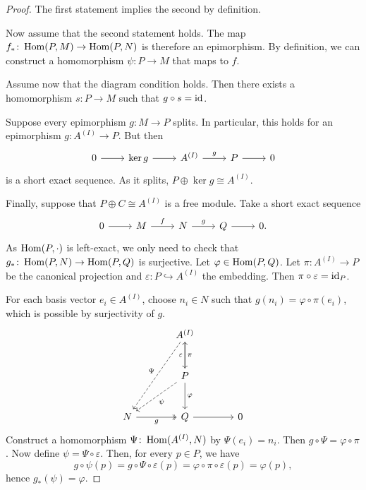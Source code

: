 \begin{proof}
The first statement implies the second by definition.

Now assume that the second statement holds. The map
$f_* \colon \operatorname{Hom}(P, M) \to \operatorname{Hom}(P, N)$ is therefore an epimorphism.
By definition, we can construct a homomorphism
$\psi \colon P \to M$ that maps to $f$.

Assume now that the diagram condition holds. Then there exists
a homomorphism $s \colon P \to M$ such that $g \circ s = \operatorname{id}$.

Suppose every epimorphism $g \colon M \to P$ splits. In particular,
this holds for an epimorphism $g \colon A^{(I)} \to P$. But then
\[
\begin{tikzcd}
0 \arrow[r] &
\ker g \arrow[r] &
A^{(I)} \arrow[r, "g"] &
P \arrow[r] &
0
\end{tikzcd}
\]
is a short exact sequence. As it splits,
$P \oplus \ker g \cong A^{(I)}$.

Finally, suppose that $P \oplus C \cong A^{(I)}$ is a free module.
Take a short exact sequence
\[
\begin{tikzcd}
0 \arrow[r] &
M \arrow[r, "f"] &
N \arrow[r, "g"] &
Q \arrow[r] &
0.
\end{tikzcd}
\]
As $\operatorname{Hom}(P, \cdot)$ is left-exact, we only need to check that
$g_* \colon \operatorname{Hom}(P, N) \to \operatorname{Hom}(P, Q)$ is surjective. Let
$\varphi \in \operatorname{Hom}(P, Q)$. Let $\pi \colon A^{(I)} \to P$ be the
canonical projection and
$\varepsilon \colon P \hookrightarrow A^{(I)}$ the embedding. Then
$\pi \circ \varepsilon = \operatorname{id}_P$.

For each basis vector $e_i \in A^{(I)}$, choose $n_i \in N$ such
that $g(n_i) = \varphi \circ \pi(e_i)$, which is possible by
surjectivity of $g$.
\[
\begin{tikzcd}[row sep=large, column sep=large]
& A^{(I)} \arrow[d, "\pi"] \arrow[ddl, dashed, "\Psi"'] \\
& P \arrow[u, "\varepsilon"] \arrow[d, "\varphi"]
\arrow[dl, dashed, "\psi"] \\
N \arrow[r, "g"', two heads] &
Q \arrow[r] &
0
\end{tikzcd}
\]
Construct a homomorphism $\Psi \colon \operatorname{Hom}(A^{(I)}, N)$ by
$\Psi(e_i) = n_i$. Then $g \circ \Psi = \varphi \circ \pi$. Now
define $\psi = \Psi \circ \varepsilon$. Then, for every $p \in P$,
we have
\[
g \circ \psi(p) =
g \circ \Psi \circ \varepsilon(p) =
\varphi \circ \pi \circ \varepsilon(p) =
\varphi(p),
\]
hence $g_*(\psi) = \varphi$.
\end{proof}
